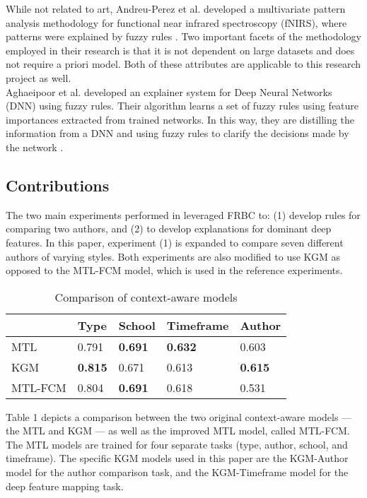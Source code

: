 \documentclass{article}
\begin{document}
While not related to art, Andreu-Perez et al. developed a multivariate pattern analysis methodology for functional near infrared spectroscopy (fNIRS), where patterns were explained by fuzzy rules \cite{andreu}. Two important facets of the methodology employed in their research is that it is not dependent on large datasets and does not require a priori model. Both of these attributes are applicable to this research project as well. \\

Aghaeipoor et al. developed an explainer system for Deep Neural Networks (DNN) using fuzzy rules. Their algorithm learns a set of fuzzy rules using feature importances extracted from trained networks. In this way, they are distilling the information from a DNN and using fuzzy rules to clarify the decisions made by the network \cite{aghaeipoor}.



\subsection{Contributions}
The two main experiments performed in \cite{Fuminides} leveraged FRBC to: (1) develop rules for comparing two authors, and (2) to develop explanations for dominant deep features. In this paper, experiment (1) is expanded to compare seven different authors of varying styles. Both experiments are also modified to use KGM as opposed to the MTL-FCM model, which is used in the reference experiments.

\begin{table}[h!]
\centering
\begin{tabular}{|l|l|l|l|l|}
\hline
\rowcolor[HTML]{C0C0C0} 
\multicolumn{1}{|c|}{\cellcolor[HTML]{C0C0C0}Method} & Type & School & Timeframe & Author \\ \hline
\cellcolor[HTML]{C0C0C0}MTL & 0.791 & \textbf{0.691} & \textbf{0.632} & 0.603 \\ \hline
\cellcolor[HTML]{C0C0C0}KGM & \textbf{0.815} & 0.671 & 0.613 & \textbf{0.615} \\ \hline
\cellcolor[HTML]{C0C0C0}MTL-FCM & 0.804 & \textbf{0.691} & 0.618 & 0.531 \\ \hline
\end{tabular}
\caption{Comparison of context-aware models}
\label{tab:my-table}
\end{table}

Table 1 depicts a comparison between the two original context-aware models --- the MTL and KGM --- as well as the improved MTL model, called MTL-FCM. The MTL models are trained for four separate tasks (type, author, school, and timeframe). The specific KGM models used in this paper are the KGM-Author model for the author comparison task, and the KGM-Timeframe model for the deep feature mapping task.
\end{document}
